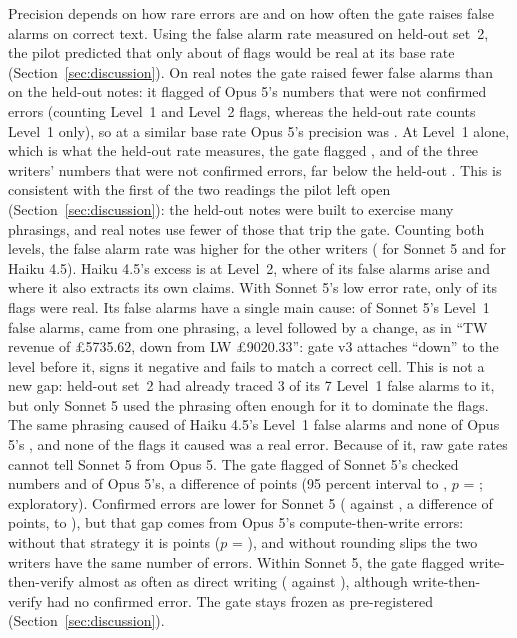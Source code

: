 \documentclass[11pt]{article}
\begin{document}
Precision depends on how rare errors are and on how often the gate raises false alarms on correct text. Using the false alarm rate measured on held-out set~2, the pilot predicted that only about \ExpectedPrecision{} of flags would be real at its base rate (Section~\ref{sec:discussion}). On real notes the gate raised fewer false alarms than on the held-out notes: it flagged \FARateOpus{} of Opus 5's numbers that were not confirmed errors (counting Level~1 and Level~2 flags, whereas the held-out rate counts Level~1 only), so at a similar base rate Opus 5's precision was \PrecOpus{}. At Level~1 alone, which is what the held-out rate measures, the gate flagged \LoneFARateOpus{}, \LoneFARateSonnet{} and \LoneFARateHaiku{} of the three writers' numbers that were not confirmed errors, far below the held-out \HeldTwoLoneFAPct{}. This is consistent with the first of the two readings the pilot left open (Section~\ref{sec:discussion}): the held-out notes were built to exercise many phrasings, and real notes use fewer of those that trip the gate. Counting both levels, the false alarm rate was higher for the other writers (\FARateSonnet{} for Sonnet 5 and \FARateHaiku{} for Haiku 4.5). Haiku 4.5's excess is at Level~2, where \LtwoOnlyFAHaiku{} of its \FATotalHaiku{} false alarms arise and where it also extracts its own claims. With Sonnet 5's low error rate, only \PrecSonnet{} of its flags were real. Its false alarms have a single main cause: of Sonnet 5's \LoneFASonnet{} Level~1 false alarms, \LoneFATrailSonnet{} came from one phrasing, a level followed by a change, as in ``TW revenue of \pounds5735.62, down from LW \pounds9020.33'': gate v3 attaches ``down'' to the level before it, signs it negative and fails to match a correct cell. This is not a new gap: held-out set~2 had already traced 3 of its 7 Level~1 false alarms to it, but only Sonnet 5 used the phrasing often enough for it to dominate the flags. The same phrasing caused \LoneFATrailHaiku{} of Haiku 4.5's \LoneFAHaiku{} Level~1 false alarms and none of Opus 5's \LoneFAOpus{}, and none of the flags it caused was a real error. Because of it, raw gate rates cannot tell Sonnet 5 from Opus 5. The gate flagged \GateSonnetAll{} of Sonnet 5's checked numbers and \GateOpusAll{} of Opus 5's, a difference of \SoOpGate{} points (95 percent interval \SoOpGateLo{} to \SoOpGateHi{}, $p$ = \SoOpGateP{}; exploratory). Confirmed errors are lower for Sonnet 5 (\ConfSonnetAll{} against \ConfOpusAll{}, a difference of \SoOpConf{} points, \SoOpConfLo{} to \SoOpConfHi{}), but that gap comes from Opus 5's compute-then-write errors: without that strategy it is \SoOpConfNoTwo{} points ($p$ = \SoOpConfNoTwoP{}), and without rounding slips the two writers have the same number of errors. Within Sonnet 5, the gate flagged write-then-verify almost as often as direct writing (\GateSonnetThree{} against \GateSonnetOne{}), although write-then-verify had no confirmed error. The gate stays frozen as pre-registered (Section~\ref{sec:discussion}).
\end{document}
